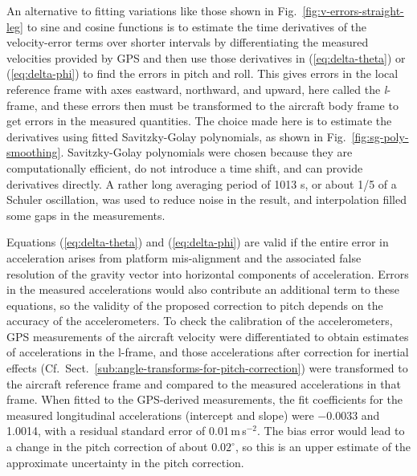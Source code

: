 \documentclass[12pt,twoside,english]{article}\usepackage[]{graphicx}\usepackage[]{color}
\let\OrgIndex\index
\renewcommand*{\index}[1]{\OrgIndex{#1}}
\begin{document}
{{An alternative to fitting variations like those shown in Fig.~\ref{fig:v-errors-straight-leg} to sine and cosine functions is to estimate the time derivatives of the velocity-error terms over shorter intervals by differentiating the measured velocities provided by GPS and then use those derivatives in (\ref{eq:delta-theta}) or (\ref{eq:delta-phi}) to find the errors in pitch and roll. This gives errors in the local reference frame with axes eastward, northward, and upward, here called the\emph{ l}-frame, and these errors then must be transformed to the aircraft body frame to get errors in the measured quantities. The choice made here is to estimate the derivatives using fitted Savitzky-Golay polynomials, as shown in Fig.~\ref{fig:sg-poly-smoothing}. Savitzky-Golay polynomials were chosen because they are computationally efficient, do not introduce a time shift, and can provide derivatives directly. A rather long averaging period of 1013 s, or about 1/5 of a Schuler oscillation, was used to reduce noise in the result, and interpolation filled some gaps in the measurements. 

Equations (\ref{eq:delta-theta}) and (\ref{eq:delta-phi}) are valid if the entire error in acceleration arises from platform mis-alignment and the associated false resolution of the gravity vector into horizontal components of acceleration. Errors in the measured accelerations would also contribute an additional term to these equations, so the validity of the proposed correction to pitch depends on the accuracy of the accelerometers. 
To check the calibration of the accelerometers, GPS measurements of the aircraft velocity were differentiated to obtain estimates of accelerations in the l-frame, and those accelerations after correction for inertial effects (Cf.\ Sect.\ \ref{sub:angle-transforms-for-pitch-correction}) were transformed to the aircraft reference frame and compared to the measured accelerations in that frame. 
When fitted to the GPS-derived measurements, the fit coefficients for the measured longitudinal accelerations (intercept and slope) were $-0.0033$ and 1.0014, with a residual standard error of 0.01\,m\,s$^{-2}$. 
The bias error would lead to a change in the pitch correction of about $0.02^{\circ}$, so this is an upper estimate of the approximate uncertainty in the pitch correction.

}}
\end{document}
